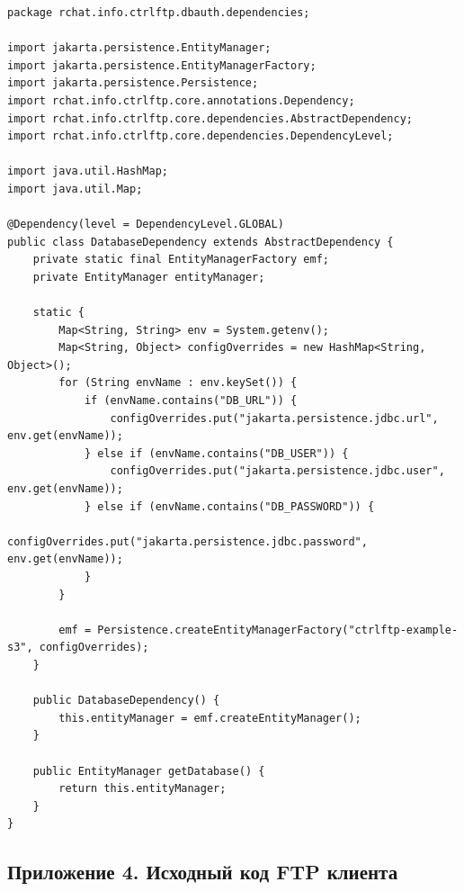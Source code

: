 \documentclass[a4paper,14pt]{extarticle}
\begin{document}
\begin{verbatim}
package rchat.info.ctrlftp.dbauth.dependencies;

import jakarta.persistence.EntityManager;
import jakarta.persistence.EntityManagerFactory;
import jakarta.persistence.Persistence;
import rchat.info.ctrlftp.core.annotations.Dependency;
import rchat.info.ctrlftp.core.dependencies.AbstractDependency;
import rchat.info.ctrlftp.core.dependencies.DependencyLevel;

import java.util.HashMap;
import java.util.Map;

@Dependency(level = DependencyLevel.GLOBAL)
public class DatabaseDependency extends AbstractDependency {
    private static final EntityManagerFactory emf;
    private EntityManager entityManager;

    static {
        Map<String, String> env = System.getenv();
        Map<String, Object> configOverrides = new HashMap<String, Object>();
        for (String envName : env.keySet()) {
            if (envName.contains("DB_URL")) {
                configOverrides.put("jakarta.persistence.jdbc.url", env.get(envName));
            } else if (envName.contains("DB_USER")) {
                configOverrides.put("jakarta.persistence.jdbc.user", env.get(envName));
            } else if (envName.contains("DB_PASSWORD")) {
                configOverrides.put("jakarta.persistence.jdbc.password", env.get(envName));
            }
        }

        emf = Persistence.createEntityManagerFactory("ctrlftp-example-s3", configOverrides);
    }

    public DatabaseDependency() {
        this.entityManager = emf.createEntityManager();
    }

    public EntityManager getDatabase() {
        return this.entityManager;
    }
}
\end{verbatim}
\subsection{Приложение 4. Исходный код FTP клиента}
\fi
\end{document}
